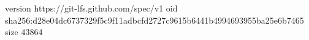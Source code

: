 version https://git-lfs.github.com/spec/v1
oid sha256:d28e04dc6737329f5c9f11adbcfd2727c9615b6441b4994693955ba25e6b7465
size 43864
